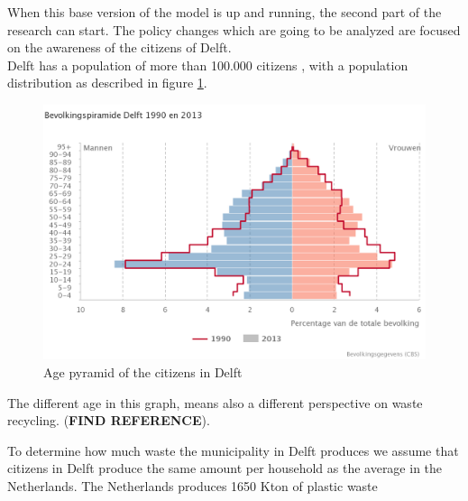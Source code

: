 \noindent When this base version of the model is up and running, the second part of the research can start. The policy changes which are going to be analyzed are focused on the awareness of the citizens of Delft. \\
Delft has a population of more than 100.000 citizens \cite{Population2021}, with a population distribution as described in figure \ref{fig:Demographic_Pyramide}.

\begin{figure}[H]
    \centering
        \captionsetup{width=\linewidth}
        \includegraphics[width=0.7\linewidth]{Images/Piramide_Delft.png}
        \caption{Age pyramid of the citizens in Delft \cite{RIVM}}
    \label{fig:Demographic_Pyramide}
\end{figure}
\noindent The different age in this graph, means also a different perspective on waste recycling. (\textbf{FIND REFERENCE}).

\noindent To determine how much waste the municipality in Delft produces we assume that citizens in Delft produce the same amount per household as the average in the Netherlands. The Netherlands produces 1650 Kton of plastic waste